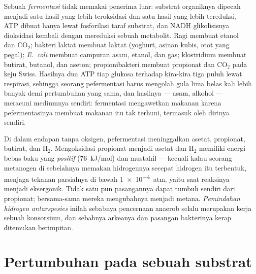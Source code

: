 \begin{definition}\label{def:b2:microbial-metabolism:fermentation}
Sebuah \emph{fermentasi} tidak memakai penerima luar: substrat
organiknya dipecah menjadi satu hasil yang lebih teroksidasi dan satu
hasil yang lebih tereduksi, ATP dibuat hanya lewat fosforilasi taraf
substrat, dan NADH glikolisisnya dioksidasi kembali dengan mereduksi
sebuah metabolit. Ragi membuat etanol dan $\mathrm{CO_2}$; bakteri
laktat membuat laktat (yoghurt, asinan kubis, otot yang pegal);
\emph{E.~coli} membuat campuran asam, etanol, dan gas; klostridium
membuat butirat, butanol, dan aseton; propionibakteri membuat propionat
dan $\mathrm{CO_2}$ pada keju Swiss. Hasilnya dua ATP tiap glukosa
terhadap kira-kira tiga puluh lewat respirasi, sehingga seorang
pefermentasi harus mengolah gula lima belas kali lebih banyak demi
pertumbuhan yang sama, dan hasilnya --- asam, alkohol --- meracuni
mediumnya sendiri: fermentasi mengawetkan makanan karena pefermentasinya
membuat makanan itu tak terhuni, termasuk oleh dirinya sendiri.
\end{definition}

\begin{example}\label{ex:b2:microbial-metabolism:syntrophy}
Di dalam endapan tanpa oksigen, pefermentasi meninggalkan asetat,
propionat, butirat, dan $\mathrm{H_2}$. Mengoksidasi propionat menjadi
asetat dan $\mathrm{H_2}$ memiliki energi bebas baku yang
\emph{positif} (\qty{+76}{kJ/mol}) dan mustahil --- kecuali kalau
seorang metanogen di sebelahnya memakan hidrogennya secepat hidrogen
itu terbentuk, menjaga tekanan parsialnya di bawah \qty{1e-4}{atm},
yaitu saat reaksinya menjadi eksergonik. Tidak satu pun pasangannya
dapat tumbuh sendiri dari propionat; bersama-sama mereka mengubahnya
menjadi metana. \emph{Pemindahan hidrogen antarspesies} inilah sebabnya
pencernaan anaerob selalu merupakan kerja sebuah konsorsium, dan
sebabnya arkeanya dan pasangan bakterinya kerap ditemukan berimpitan.
\end{example}

\section{Pertumbuhan pada sebuah substrat}

